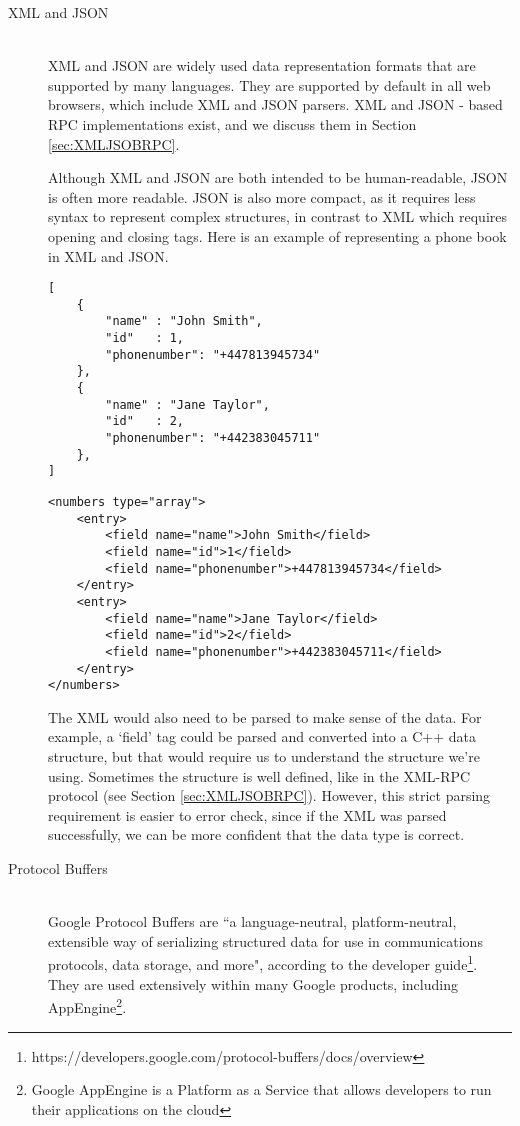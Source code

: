 \begin{description}
	\item[XML and JSON] 
	~\\
	XML and JSON are widely used data representation formats that are supported by many languages. They are supported by default in all web browsers, which include XML and JSON parsers. XML and JSON - based RPC implementations exist, and we discuss them in Section \ref{sec:XMLJSOBRPC}.

	Although XML and JSON are both intended to be human-readable, JSON is often more readable. JSON is also more compact, as it requires less syntax to represent complex structures, in contrast to XML which requires opening and closing tags. Here is an example of representing a phone book in XML and JSON.

	\begin{lstlisting}
[
	{
		"name" : "John Smith",
		"id"   : 1,
		"phonenumber": "+447813945734"
	},
	{
		"name" : "Jane Taylor",
		"id"   : 2,
		"phonenumber": "+442383045711"
	},
]
	\end{lstlisting}
	\begin{lstlisting}
<numbers type="array">
    <entry>
    	<field name="name">John Smith</field>
    	<field name="id">1</field>
    	<field name="phonenumber">+447813945734</field>
    </entry>
    <entry>
    	<field name="name">Jane Taylor</field>
    	<field name="id">2</field>
    	<field name="phonenumber">+442383045711</field>
    </entry>
</numbers>
	\end{lstlisting}

	The XML would also need to be parsed to make sense of the data. For example, a `field' tag could be parsed and converted into a C++ data structure, but that would require us to understand the structure we're using. Sometimes the structure is well defined, like in the XML-RPC protocol (see Section \ref{sec:XMLJSOBRPC}). However, this strict parsing requirement is easier to error check, since if the XML was parsed successfully, we can be more confident that the data type is correct. 

	\item[Protocol Buffers] 
	~\\
	Google Protocol Buffers are ``a language-neutral, platform-neutral, extensible way of serializing structured data for use in communications protocols, data storage, and more", according to the developer guide\footnote{\label{googleprotobuff}https://developers.google.com/protocol-buffers/docs/overview}. They are used extensively within many Google products, including AppEngine\footnote{Google AppEngine is a Platform as a Service that allows developers to run their applications on the cloud}. 


\end{description}
